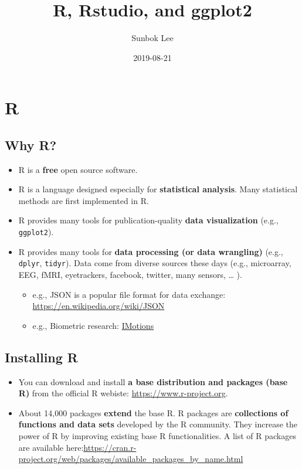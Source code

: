 \documentclass[]{book}
\title{R, Rstudio, and ggplot2}
\author{Sunbok Lee}
\date{2019-08-21}
\providecommand{\tightlist}{%
  \setlength{\itemsep}{0pt}\setlength{\parskip}{0pt}}
\begin{document}
\maketitle

{
\setcounter{tocdepth}{1}
\tableofcontents
}
\chapter{R}\label{r}

\section{Why R?}\label{why-r}

\begin{itemize}
\tightlist
\item
  R is a \textbf{free} open source software.
\item
  R is a language designed especially for \textbf{statistical analysis}.
  Many statistical methods are first implemented in R.
\item
  R provides many tools for publication-quality \textbf{data
  visualization} (e.g., \texttt{ggplot2}).
\item
  R provides many tools for \textbf{data processing (or data wrangling)}
  (e.g., \texttt{dplyr}, \texttt{tidyr}). Data come from diverse sources
  these days (e.g., microarray, EEG, fMRI, eyetrackers, facebook,
  twitter, many sensors, \ldots{} ).

  \begin{itemize}
  \tightlist
  \item
    e.g., JSON is a popular file format for data exchange:
    \url{https://en.wikipedia.org/wiki/JSON}
  \item
    e.g., Biometric research:
    \href{https://imotions.com/?creative=287840870074\&keyword=imotions\&matchtype=p\&network=g\&device=c\&gclid=EAIaIQobChMI3pas5oOO5AIVlBx9Ch28hwboEAAYASAAEgJlUfD_BwE}{IMotions}
  \end{itemize}
\end{itemize}

\section{Installing R}\label{installing-r}

\begin{itemize}
\item
  You can download and install \textbf{a base distribution and packages
  (base R)} from the official R webiste:
  \url{https://www.r-project.org}.
\item
  About 14,000 packages \textbf{extend} the base R. R packages are
  \textbf{collections of functions and data sets} developed by the R
  community. They increase the power of R by improving existing base R
  functionalities. A list of R packages are available
  here:\url{https://cran.r-project.org/web/packages/available_packages_by_name.html}
\end{itemize}
\end{document}
